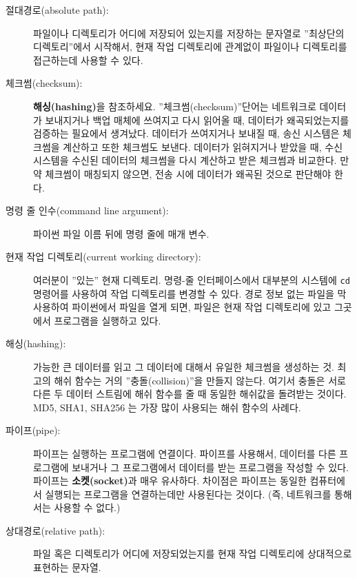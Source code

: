 \begin{description}

\item[절대경로(absolute path):]
파일이나 디렉토리가 어디에 저장되어 있는지를 저장하는 문자열로 ''최상단의 디렉토리''에서 시작해서,
현재 작업 디렉토리에 관계없이 파일이나 디렉토리를 접근하는데 사용할 수 있다.

\item[체크썸(checksum):] {\bf 해싱(hashing)}을 참조하세요.
''체크썸(checksum)''단어는 네트워크로 데이터가 보내지거나 백업 매체에 쓰여지고 다시 읽어올 때, 데이터가 왜곡되었는지를
검증하는 필요에서 생겨났다.
데이터가 쓰여지거나 보내질 때, 송신 시스템은 체크썸을 계산하고 또한 체크썸도 보낸다.
데이터가 읽혀지거나 받았을 때, 수신 시스템을 수신된 데이터의 체크썸을 다시 계산하고 받은 체크썸과 비교한다.
만약 체크썸이 매칭되지 않으면, 전송 시에 데이터가 왜곡된 것으로 판단해야 한다.


\item[명령 줄 인수(command line argument):]파이썬 파일 이름 뒤에 명령 줄에 매개 변수.

\item[현재 작업 디렉토리(current working directory):]
여러분이 ''있는'' 현재 디렉토리. 명령-줄 인터페이스에서 대부분의 시스템에 {\tt cd} 명령어를 사용하여
작업 디렉토리를 변경할 수 있다. 경로 정보 없는 파일을 막 사용하여 파이썬에서 파일을 열게 되면,
파일은 현재 작업 디렉토리에 있고 그곳에서 프로그램을 실행하고 있다.


\item[해싱(hashing):] 
가능한 큰 데이터를 읽고 그 데이터에 대해서 유일한 체크썸을 생성하는 것.
최고의 해쉬 함수는 거의 ''충돌(collision)''을 만들지 않는다. 여기서 충돌은 
서로 다른 두 데이터 스트림에 해쉬 함수를 줄 때 동일한 해쉬값을 돌려받는 것이다.
MD5, SHA1, SHA256 는 가장 많이 사용되는 해쉬 함수의 사례다.

\item[파이프(pipe):]
파이프는 실행하는 프로그램에 연결이다. 파이프를 사용해서, 데이터를 다른 프로그램에 보내거나 그 프로그램에서
데이터를 받는 프로그램을 작성할 수 있다.
파이프는 {\bf 소켓(socket)}과 매우 유사하다. 차이점은 파이프는 동일한 컴퓨터에서 실행되는 프로그램을 연결하는데만 사용된다는 것이다. 
(즉, 네트워크를 통해서는 사용할 수 없다.)

\item[상대경로(relative path):]
파일 혹은 디렉토리가 어디에 저장되었는지를 현재 작업 디렉토리에 상대적으로 표현하는 문자열.


\end{description}
